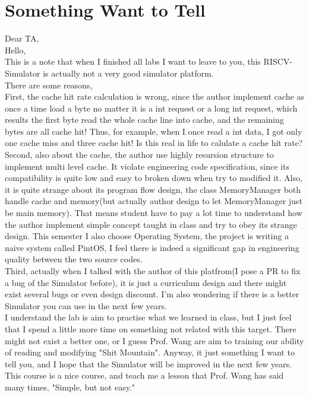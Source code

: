 \mathbb{R} \documentclass{article}
\begin{document}
\section{Something Want to Tell}
Dear TA,\\
Hello,\\
This is a note that when I finished all labs I want to leave to you, this RISCV-Simulator is actually not a very good simulator platform.\\
There are some reasons,\\
First, the cache hit rate calculation is wrong, since the author implement cache as once a time load a byte no matter it is a int request or a long int request, which results the first byte read the whole cache line into cache, and the remaining bytes are all cache hit! Thus, for example, when I once read a int data, I got only one cache miss and three cache hit! Is this real in life to calulate a cache hit rate?\\
Second, also about the cache, the author use highly resursion structure to implement multi level cache. It violate engineering code specification, since its compatibility is quite low and easy to broken down when try to modified it. Also, it is quite strange about its program flow design, the class MemoryManager both handle cache and memory(but actually author design to let MemoryManager just be main memory). That means student have to pay a lot time to understand how the author implement simple concept taught in class and try to obey its strange design. This semester I also choose Operating System, the project is writing a naive system called PintOS, I feel there is indeed a significant gap in engineering quality between the two source codes.\\
Third, actually when I talked with the author of this platfrom(I pose a PR to fix a bug of the Simulator before), it is just a curriculum design and there might exist several bugs or even design discount. I'm also wondering if there is a better Simulator you can use in the next few years.\\
I understand the lab is aim to practise what we learned in class, but I just feel that I spend a little more time on something not related with this target. There might not exist a better one, or I guess Prof. Wang are aim to training our ability of reading and modifying "Shit Mountain". Anyway, it just something I want to tell you, and I hope that the Simulator will be improved in the next few years. This course is a nice course, and teach me a lesson that Prof. Wang has said many times, "Simple, but not easy." 
\end{document}
